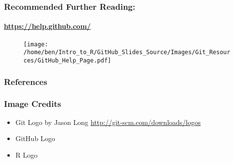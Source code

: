 \documentclass[xcolor=dvipsnames]{beamer}
\begin{document}
\begin{frame}
\frametitle{Recommended Further Reading:}
\framesubtitle{\url{https://help.github.com/}}
%
\begin{center}
\begin{figure}
\texttt{[image: /home/ben/Intro\_to\_R/GitHub\_Slides\_Source/Images/Git\_Resources/GitHub\_Help\_Page.pdf]}
\end{figure}

\end{center}

\end{frame}


\begin{frame}
\frametitle{References}


\end{frame}

\begin{frame}
\frametitle{Image Credits}
\begin{itemize}
\item Git Logo by Jason Long \url{http://git-scm.com/downloads/logos}
\item GitHub Logo 
\item R Logo
\end{itemize}
\end{frame}
\end{document}
